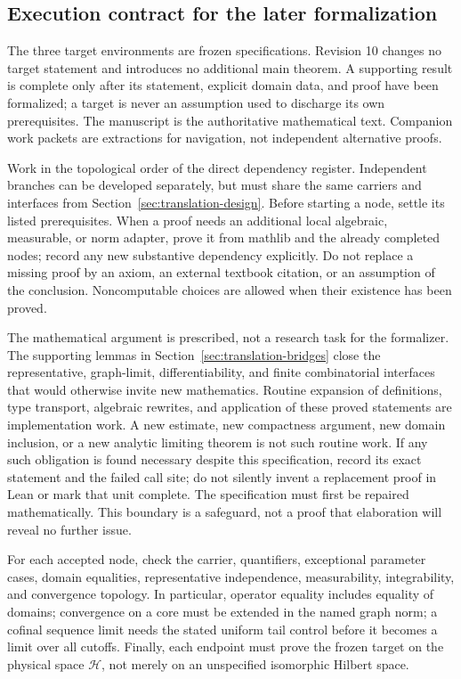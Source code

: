 \documentclass[11pt,a4paper]{article}
\theoremstyle{definition}
\theoremstyle{remark}
\begin{document}
\subsection{Execution contract for the later formalization}
\label{sec:execution-contract}
The three target environments are frozen specifications. Revision 10
changes no target statement and introduces no additional main theorem.
A supporting result is complete only after its statement, explicit
domain data, and proof have been formalized; a target is never an
assumption used to discharge its own prerequisites. The manuscript is
the authoritative mathematical text. Companion work packets are
extractions for navigation, not independent alternative proofs.

Work in the topological order of the direct dependency register.
Independent branches can be developed separately, but must share the
same carriers and interfaces from Section~\ref{sec:translation-design}.
Before starting a node, settle its listed prerequisites. When a proof
needs an additional local algebraic, measurable, or norm adapter,
prove it from mathlib and the already completed nodes; record any new
substantive dependency explicitly. Do not replace a missing proof by
an axiom, an external textbook citation, or an assumption of the
conclusion. Noncomputable choices are allowed when their existence
has been proved.

The mathematical argument is prescribed, not a research task for the
formalizer. The supporting lemmas in Section~\ref{sec:translation-bridges}
close the representative, graph-limit, differentiability, and finite
combinatorial interfaces that would otherwise invite new mathematics.
Routine expansion of definitions, type transport, algebraic rewrites,
and application of these proved statements are implementation work.
A new estimate, new compactness argument, new domain inclusion, or a
new analytic limiting theorem is not such routine work. If any such
obligation is found necessary despite this specification, record its
exact statement and the failed call site; do not silently invent a
replacement proof in Lean or mark that unit complete. The specification
must first be repaired mathematically. This boundary is a safeguard,
not a proof that elaboration will reveal no further issue.


For each accepted node, check the carrier, quantifiers, exceptional
parameter cases, domain equalities, representative independence,
measurability, integrability, and convergence topology. In particular,
operator equality includes equality of domains; convergence on a
core must be extended in the named graph norm; a cofinal sequence
limit needs the stated uniform tail control before it becomes a
limit over all cutoffs. Finally, each endpoint must prove the frozen
target on the physical space $\mathcal H$, not merely on an unspecified
isomorphic Hilbert space.
\end{document}
